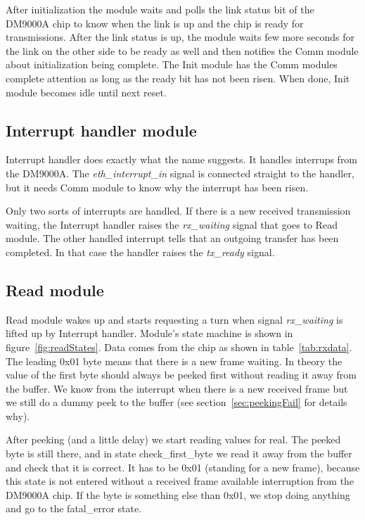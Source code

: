 \documentclass{article}
\begin{document}
After initialization the module waits and polls the link status bit of
the DM9000A chip to know when the link is up and the chip is ready for
transmissions. After the link status is up, the module waits few more
seconds for the link on the other side to be ready as well and then
notifies the Comm module about initialization being complete.  The
Init module has the Comm modules complete attention as long as the
ready bit has not been risen. When done, Init module becomes idle
until next reset.




\subsection{Interrupt handler module}

Interrupt handler does exactly what the name suggests. It handles
interrups from the DM9000A. The \emph{eth\_interrupt\_in} signal is
connected straight to the handler, but it needs Comm module to know
why the interrupt has been risen.

Only two sorts of interrupts are handled. If there is a new received
transmission waiting, the Interrupt handler raises the
\emph{rx\_waiting} signal that goes to Read module.  The other handled
interrupt tells that an outgoing transfer has been completed. In that
case the handler raises the \emph{tx\_ready} signal.


\subsection{Read module} \label{sec:readModule}

Read module wakes up and starts requesting a turn when signal
\emph{rx\_waiting} is lifted up by Interrupt handler. Module's state
machine is shown in figure~\ref{fig:readStates}. Data comes from
the chip as shown in table~\ref{tab:rxdata}. The leading 0x01 byte
means that there is a new frame waiting. In theory the value of the
first byte should always be peeked first without reading it away from
the buffer. We know from the interrupt when there is a new received
frame but we still do a dummy peek to the buffer (see
section~\ref{sec:peekingFail} for details why).

After peeking (and a little delay) we start reading values for real.
The peeked byte is still there, and in state check\_first\_byte we
read it away from the buffer and check that it is correct. It has to
be 0x01 (standing for a new frame), because this state is not entered
without a received frame available interruption from the DM9000A chip.
If the byte is something else than 0x01, we stop doing anything and go
to the fatal\_error state.
\end{document}
